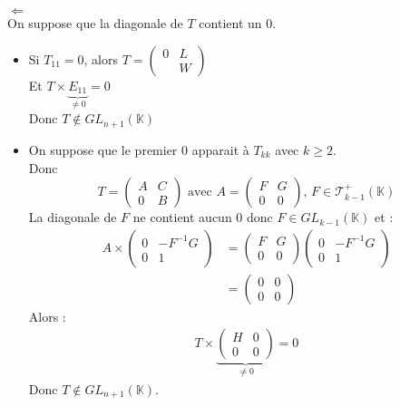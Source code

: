 \documentclass[../main.tex]{subfiles}
\begin{document}
$\boxed{\Leftarrow}$ \\
On suppose que la diagonale de $T$ contient un $0$. \\
\begin{itemize}
    \item Si $T_{11} = 0$, alors $T = 
    \begin{pmatrix}
        0 & L \\
        & W
    \end{pmatrix}$ \\
    Et $T \times \underbrace{E_{11}}_{\neq 0} = 0$ \\
    Donc $T \not \in GL_{n+1}(\mathbb{K})$ \\
    
    \item On suppose que le premier $0$ apparait à $T_{kk}$ avec $k \geq 2$. \\
    Donc $$T = 
    \begin{pmatrix}
        A & C \\
        0 & B
    \end{pmatrix} 
    \text{ avec } A = 
    \begin{pmatrix}
        F & G \\
        0 & 0
    \end{pmatrix} 
    \text{, } F \in \mathcal{T}_{k-1}^+(\mathbb{K})$$ 
    La diagonale de $F$ ne contient aucun $0$ donc $F \in GL_{k - 1}(\mathbb{K})$ et :
    \begin{align*}
        A \times 
        \begin{pmatrix}
            0 & -F^{-1}G \\
            0 & 1
        \end{pmatrix}
        &= 
        \begin{pmatrix}
            F & G \\
            0 & 0
        \end{pmatrix}
        \begin{pmatrix}
            0 & -F^{-1}G \\
            0 & 1
        \end{pmatrix} \\
        &=
        \begin{pmatrix}
            0 & 0 \\
            0 & 0
        \end{pmatrix}
    \end{align*}
    Alors :
    \begin{align*}
        T \times \underbrace{\begin{pmatrix}
            H & 0 \\
            0 & 0
        \end{pmatrix}}_{\neq 0} = 0
    \end{align*}
Donc $T \not \in GL_{n+1}(\mathbb{K})$.
\end{itemize}
\end{document}
